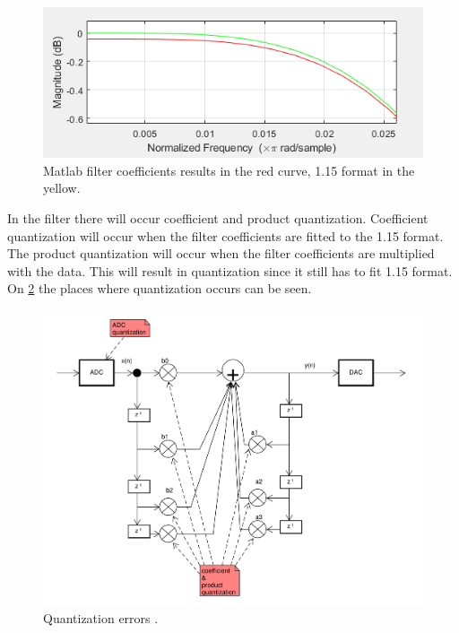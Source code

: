 \begin{figure}
	\centering
	\includegraphics[width=1\linewidth]{gfx/QuantizationFilter.png}
	\caption{Matlab filter coefficients results in the red curve, 1.15 format in the yellow.}
	\label{fig:quant_error_filter}
\end{figure}

In the filter there will occur coefficient and product quantization. Coefficient quantization will occur when the filter coefficients are fitted to the 1.15 format.
The product quantization will occur when the filter coefficients are multiplied with the data.
This will result in quantization since it still has to fit 1.15 format.
On \cref{fig:quant_error} the places where quantization occurs can be seen.

\begin{figure}
	\centering
	\includegraphics[width=1\linewidth]{gfx/Design/flow_quant_error.pdf}
	\caption{Quantization errors \systemName.}
	\label{fig:quant_error}
\end{figure}

\FloatBarrier